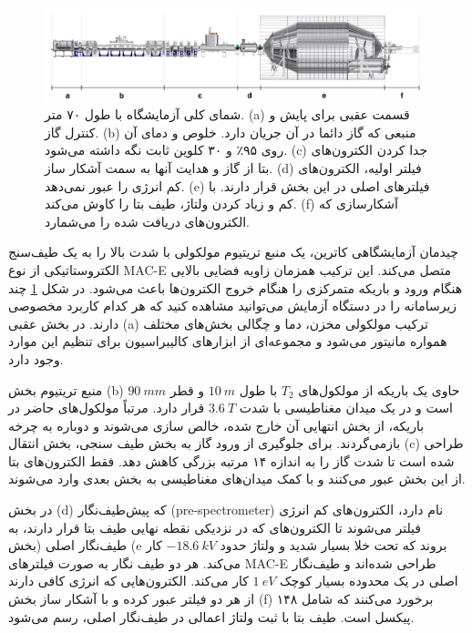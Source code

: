 \documentclass[a4paper,11pt,oneside,openany]{iut-thesis}
\begin{document}
\begin{figure}
	\includegraphics[angle=0,width=\textwidth,clip=0]{setup}
	\caption{
		شمای کلی آزمایشگاه با طول ۷۰ متر. (a) قسمت عقبی برای پایش و کنترل گاز. (b) منبعی که گاز دائما در آن جریان دارد. خلوص و دمای آن روی ۹۵٪ و ۳۰ کلوین ثابت نگه داشته می‌شود. (c) جدا کردن الکترون‌های بتا از گاز و هدایت آنها به سمت آشکار ساز. (d) فیلتر اولیه، الکترون‌های کم انرژی را عبور نمی‌دهد. (e) فیلترهای اصلی در این بخش قرار دارند. با کم و زیاد کردن ولتاژ، طیف بتا را کاوش می‌کند. (f) آشکارسازی که الکترون‌های دریافت شده را می‌شمارد.
	}
	\label{set}
\end{figure}

چیدمان آزمایشگاهی کاترین، یک منبع تریتیوم مولکولی با شدت بالا را به یک طیف‌سنج الکتروستاتیکی از نوع MAC-E متصل می‌کند. این ترکیب همزمان زاویه فضایی بالایی هنگام ورود و باریکه متمرکزی را هنگام خروج الکترون‌ها باعث می‌شود. در شکل
\ref{set} 
 چند زیرسامانه را در دستگاه آزمایش می‌توانید مشاهده کنید که هر کدام کاربرد مخصوصی دارند. در بخش عقبی (a) ترکیب مولکولی مخزن، دما و چگالی بخش‌های مختلف همواره مانیتور می‌شود و مجموعه‌ای از ابزارهای کالیبراسیون برای تنظیم این موارد وجود دارد.
 
منبع تریتیوم بخش (b) حاوی یک باریکه از مولکول‌های 
$T_{2}$ 
با طول $10~m$ و قطر $90~mm$ است و در یک میدان مغناطیسی با شدت $3.6~T$ قرار دارد. مرتباً مولکول‌های حاضر در باریکه، از بخش انتهایی آن خارج شده، خالص سازی می‌شوند و دوباره به چرخه بازمی‌گردند. برای جلوگیری از ورود گاز به بخش طیف سنجی، بخش انتقال (c) طراحی شده است تا شدت گاز را به اندازه ۱۴ مرتبه بزرگی کاهش دهد. فقط الکترون‌های بتا از این بخش عبور می‌کنند و با کمک میدان‌های مغناطیسی به بخش بعدی وارد می‌شوند.
		
در بخش (d) که پیش‌طیف‌نگار (pre-spectrometer) نام دارد، الکترون‌های کم انرژی فیلتر می‌شوند تا الکترون‌های که در نزدیکی نقطه نهایی طیف بتا قرار دارند، به طیف‌نگار اصلی (بخش 
(e
بروند که تحت خلا بسیار شدید و ولتاژ حدود $-18.6~kV$ کار می‌کند. هر دو طیف نگار به صورت فیلترهای MAC-E طراحی شده‌اند و طیف‌نگار اصلی در یک محدوده بسیار کوچک $1~eV$ کار می‌کند. الکترون‌هایی که انرژی کافی دارند از هر دو فیلتر عبور کرده و با آشکار ساز بخش (f) برخورد می‌کنند که شامل ۱۴۸ پیکسل است. طیف بتا با ثبت ولتاژ اعمالی در طیف‌نگار اصلی، رسم می‌شود.
\end{document}
